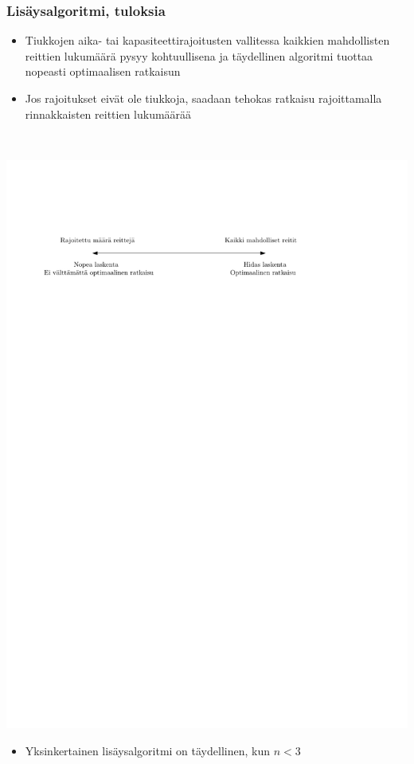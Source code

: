 \documentclass{beamer}
\begin{document}
        \begin{frame}
\frametitle{Lisäysalgoritmi, tuloksia}
 \begin{itemize}
\item
Tiukkojen aika- tai kapasiteettirajoitusten vallitessa kaikkien mahdollisten reittien lukumäärä pysyy kohtuullisena ja 
täydellinen algoritmi tuottaa nopeasti optimaalisen ratkaisun
\item
Jos rajoitukset eivät ole tiukkoja, saadaan tehokas ratkaisu
rajoittamalla rinnakkaisten reittien lukumäärää
\end{itemize}
\hfill \\
\begin{center}
\includegraphics[scale=0.7]{vskuva}
\end{center}
\begin{itemize}
 \item 
 Yksinkertainen lisäysalgoritmi on täydellinen, kun $n < 3$
\end{itemize}

\end{frame}
    
\end{document}
